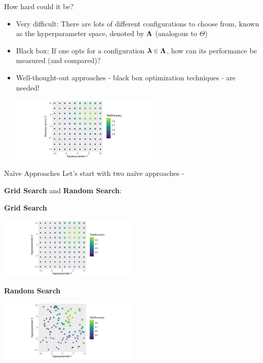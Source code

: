 \documentclass[11pt,compress,t,notes=noshow, xcolor=table]{beamer}
\begin{document}
\begin{vbframe}{How hard could it be?}
\begin{itemize}
\item \small Very difficult: There are lots of different configurations to choose from, known as the hyperparameter space, denoted by $\bm{\Lambda}$ (analogous to $\Theta$)
\item \small Black box: If one opts for a configuration $\bm{\lambda} \in \bm{\Lambda}$, how can its performance be measured (and compared)?
\item \small Well-thought-out approaches - black box optimization techniques - are needed!

\begin{center}
\vspace{2em}
\includegraphics[width=200pt]{figure/cart_tuning_balgos_1.pdf}
\end{center}

\end{itemize}
\end{vbframe}


\begin{vbframe}{Naïve Approaches}
Let's start with two naïve approaches -

\textbf{Grid Search} and \textbf{Random Search}:

\vspace{4em}
\begin{minipage}{0.51\textwidth}
\begin{center}
\textbf{Grid Search}
\end{center}

\includegraphics[width=190pt]{figure/cart_tuning_balgos_1.pdf}
\end{minipage}
\begin{minipage}{0.48\textwidth}
\begin{center}
\textbf{Random Search}
\end{center}

\includegraphics[width=190pt]{figure/cart_tuning_balgos_2.pdf}
\end{minipage}

\end{vbframe}
\end{document}
